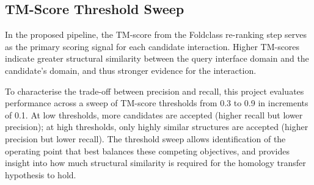 \subsection{TM-Score Threshold Sweep}

In the proposed pipeline, the TM-score from the Foldclass re-ranking step serves as the primary scoring signal for each candidate interaction.
Higher TM-scores indicate greater structural similarity between the query interface domain and the candidate's domain, and thus stronger evidence for the interaction.

To characterise the trade-off between precision and recall, this project evaluates performance across a sweep of TM-score thresholds from 0.3 to 0.9 in increments of 0.1.
At low thresholds, more candidates are accepted (higher recall but lower precision); at high thresholds, only highly similar structures are accepted (higher precision but lower recall).
The threshold sweep allows identification of the operating point that best balances these competing objectives, and provides insight into how much structural similarity is required for the homology transfer hypothesis to hold.
